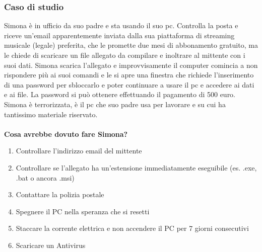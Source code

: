\documentclass{article}
\begin{document}
\subsubsection{Caso di studio}
\label{sec:Caso9}
Simona è in ufficio da suo padre e sta usando il suo pc. Controlla la posta e riceve un'email apparentemente inviata dalla sua piattaforma di streaming musicale (legale) preferita, che le promette due mesi di abbonamento gratuito, ma le chiede di scaricare un file allegato da compilare e inoltrare al mittente con i suoi dati. Simona scarica l'allegato e improvvisamente il computer comincia a non rispondere più ai suoi comandi e le si apre una finestra che richiede l'inserimento di una password per sbloccarlo e poter continuare a usare il pc e accedere ai dati e ai file. La password si può ottenere effettuando il pagamento di 500 euro. Simona è terrorizzata, è il pc che suo padre usa per lavorare e su cui ha tantissimo materiale riservato.
\\\vspace{5mm}\\
\textbf{Cosa avrebbe dovuto fare Simona?}
\begin{enumerate}
	\item Controllare l'indirizzo email del mittente		
	\item Controllare se l’allegato ha un'estensione immediatamente eseguibile (es. .exe, .bat o ancora .msi)		
	\item Contattare la polizia postale		
	\item Spegnere il PC nella speranza che si resetti		
	\item Staccare la corrente elettrica e non accendere il PC per 7 giorni consecutivi		
	\item Scaricare un Antivirus
\end{enumerate}
\end{document}
